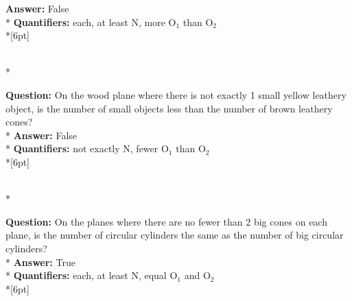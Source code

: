 \begin{figure*}
\begin{minipage}{0.48\textwidth}
\begin{minipage}[t][2.2cm][t]{1\textwidth}
      \textbf{Answer:} False \\*
      \textbf{Quantifiers:} each, at least N, more O$_1$ than O$_2$\\*[6pt]
    \end{minipage}\\*
    \begin{minipage}[t][2.2cm][t]{1\textwidth}
      \footnotesize
      \textbf{Question:}  On the wood plane where there is not exactly 1 small yellow leathery object, is the number of small objects less than the number of brown leathery cones? \\*
      \textbf{Answer:}  False \\*
      \textbf{Quantifiers:}  not exactly N, fewer O$_1$ than O$_2$ \\*[6pt]
    \end{minipage}\\*
    \begin{minipage}[t][2.2cm][t]{1\textwidth}
      \footnotesize
      \textbf{Question:} On the planes where there are no fewer than 2 big cones on each plane, is the number of circular cylinders the same as the number of big circular cylinders? \\*
      \textbf{Answer:} True \\*
      \textbf{Quantifiers:} each, at least N, equal O$_1$ and O$_2$ \\*[6pt]
    \end{minipage}
  \end{minipage}
  \vspace{0.2cm}
  

\end{figure*}
